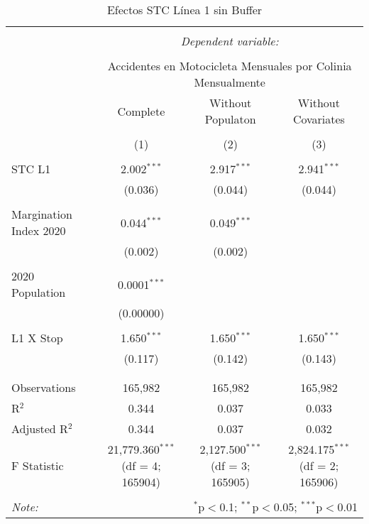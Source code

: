 
\begin{table}[!htbp] \centering 
  \caption{Efectos STC Línea 1 sin Buffer} 
  \label{} 
\begin{tabular}{@{\extracolsep{5pt}}lccc} 
\\[-1.8ex]\hline 
\hline \\[-1.8ex] 
 & \multicolumn{3}{c}{\textit{Dependent variable:}} \\ 
\cline{2-4} 
\\[-1.8ex] & \multicolumn{3}{c}{Accidentes en Motocicleta Mensuales por Colinia Mensualmente} \\ 
 & Complete & Without Populaton & Without Covariates \\ 
\\[-1.8ex] & (1) & (2) & (3)\\ 
\hline \\[-1.8ex] 
 STC L1 & 2.002$^{***}$ & 2.917$^{***}$ & 2.941$^{***}$ \\ 
  & (0.036) & (0.044) & (0.044) \\ 
  & & & \\ 
 Margination Index 2020 & 0.044$^{***}$ & 0.049$^{***}$ &  \\ 
  & (0.002) & (0.002) &  \\ 
  & & & \\ 
 2020 Population & 0.0001$^{***}$ &  &  \\ 
  & (0.00000) &  &  \\ 
  & & & \\ 
 L1 X Stop & 1.650$^{***}$ & 1.650$^{***}$ & 1.650$^{***}$ \\ 
  & (0.117) & (0.142) & (0.143) \\ 
  & & & \\ 
\hline \\[-1.8ex] 
Observations & 165,982 & 165,982 & 165,982 \\ 
R$^{2}$ & 0.344 & 0.037 & 0.033 \\ 
Adjusted R$^{2}$ & 0.344 & 0.037 & 0.032 \\ 
F Statistic & 21,779.360$^{***}$ (df = 4; 165904) & 2,127.500$^{***}$ (df = 3; 165905) & 2,824.175$^{***}$ (df = 2; 165906) \\ 
\hline 
\hline \\[-1.8ex] 
\textit{Note:}  & \multicolumn{3}{r}{$^{*}$p$<$0.1; $^{**}$p$<$0.05; $^{***}$p$<$0.01} \\ 
\end{tabular} 
\end{table} 

